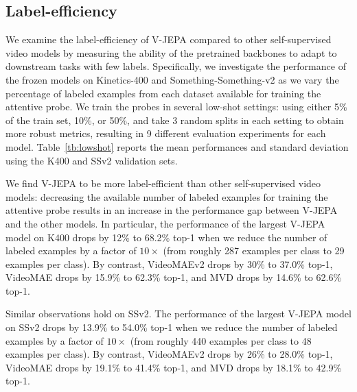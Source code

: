 \documentclass[twocolumn]{fairmeta}
\newcommand{\putalg}{{\small V-JEPA}\xspace}
\theoremstyle{plain}
\theoremstyle{definition}
\theoremstyle{remark}
\begin{document}
\subsection{Label-efficiency}
\label{subsec:lowshot}
We examine the label-efficiency of \putalg compared to other self-supervised video models by measuring the ability of the pretrained backbones to adapt to downstream tasks with few labels.
Specifically, we investigate the performance of the frozen models on Kinetics-400 and Something-Something-v2 as we vary the percentage of labeled examples from each dataset available for training the attentive probe.
We train the probes in several low-shot settings: using either 5\% of the train set, 10\%, or 50\%, and take 3 random splits in each setting to obtain more robust metrics, resulting in 9 different evaluation experiments for each model.
Table~\ref{tb:lowshot} reports the mean performances and standard deviation using the  K400 and SSv2 validation sets.

We find \putalg to be more label-efficient than other self-supervised video models: decreasing the available number of labeled examples for training the attentive probe results in an increase in the performance gap between \putalg and the other models.
In particular, the performance of the largest \putalg model on K400 drops by 12\% to 68.2\% top-1 when we reduce the number of labeled examples by a factor of $10\times$ (from roughly 287 examples per class to 29 examples per class).
By contrast, VideoMAEv2 drops by 30\% to 37.0\% top-1, VideoMAE drops by 15.9\% to 62.3\% top-1, and MVD drops by 14.6\% to 62.6\% top-1.

Similar observations hold on SSv2.
The performance of the largest \putalg model on SSv2 drops by 13.9\% to 54.0\% top-1 when we reduce the number of labeled examples by a factor of $10\times$ (from roughly 440 examples per class to 48 examples per class).
By contrast, VideoMAEv2 drops by 26\% to 28.0\% top-1, VideoMAE drops by 19.1\% to 41.4\% top-1, and MVD drops by 18.1\% to 42.9\% top-1.
\end{document}
